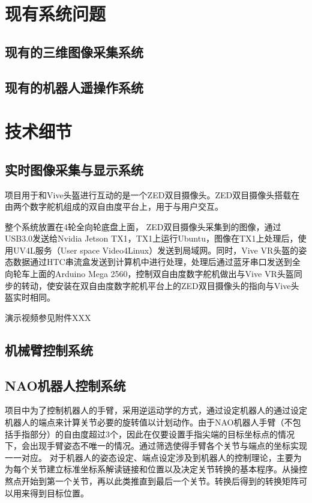 \chapter{现有系统问题}


\section{现有的三维图像采集系统}

\section{现有的机器人遥操作系统}



\chapter{技术细节}

\section{实时图像采集与显示系统}
项目用于和Vive头盔进行互动的是一个ZED双目摄像头。ZED双目摄像头搭载在由两个数字舵机组成的双自由度平台上，用于与用户交互。

整个系统放置在4轮全向轮底盘上面， ZED双目摄像头采集到的图像，通过USB3.0发送给Nvidia Jetson TX1，TX1上运行Ubuntu，图像在TX1上处理后，使用UV4L服务（User space Video4Linux）发送到局域网。同时，Vive VR头盔的姿态数据通过HTC串流盒发送到计算机中进行处理，处理后通过蓝牙串口发送到全向轮车上面的Arduino Mega 2560，控制双自由度数字舵机做出与Vive VR头盔同步的转动，使安装在双自由度数字舵机平台上的ZED双目摄像头的指向与Vive头盔实时相同。

演示视频参见附件XXX

\section{机械臂控制系统}

\section{NAO机器人控制系统}
项目中为了控制机器人的手臂，采用逆运动学的方式，通过设定机器人的通过设定机器人的端点来计算关节必要的旋转值以计划动作。由于NAO机器人手臂（不包括手指部分）的自由度超过3个，因此在仅要设置手指尖端的目标坐标点的情况下，会出现手臂姿态不唯一的情况。通过筛选使得手臂各个关节与端点的坐标实现一一对应。
对于机器人的姿态设定、端点设定涉及到机器人的控制理论，主要为为每个关节建立标准坐标系解读链接和位置以及决定关节转换的基本程序。从操控熬点开始到第一个关节，再以此类推直到最后一个关节。转换后得到的转换矩阵可以用来得到目标位置。

